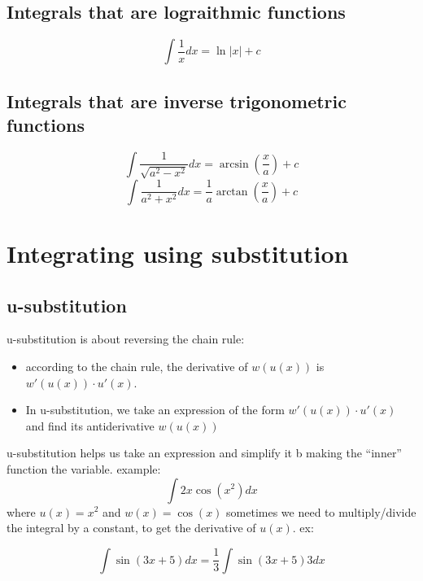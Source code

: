 \documentclass{article}
\begin{document}
                        \subsection{Integrals that are lograithmic functions}
                            \[\int \frac{1}{x} dx = \ln |x| + c\]
                        \subsection{Integrals that are inverse trigonometric functions}
                            \[\int \frac{1}{\sqrt{a^{2} - x^{2}}} dx = \arcsin (\frac{x}{a}) + c\]
                            \[\int \frac{1}{a^{2} + x^{2}} dx = \frac{1}{a} \arctan (\frac{x}{a}) + c\]
            \section{Integrating using substitution}
                        \subsection{u-substitution}
                            u-substitution is about reversing the chain rule: 
                                \begin{itemize}
                                    \item according to the chain rule, the derivative of \(w(u(x))\) is \(w'(u(x)) \cdot u'(x)\).
                                    \item In u-substitution, we take an expression of the form \(w'(u(x)) \cdot u'(x)\) and find its antiderivative \(w(u(x))\)
                                \end{itemize}
                            u-substitution helps us take an expression and simplify it b making the ``inner'' function the variable.
                            example: 
                                    \[\int 2x \cos(x^2)dx\]
                            where \(u(x) = x^2\) and \(w(x) = \cos(x)\) 
                            sometimes we need to multiply/divide the integral by a constant, to get the derivative of \(u(x)\).
                                ex: 

                                    \[\int \sin(3x + 5)dx = \frac{1}{3} \int \sin(3x + 5) 3dx\]
\end{document}
